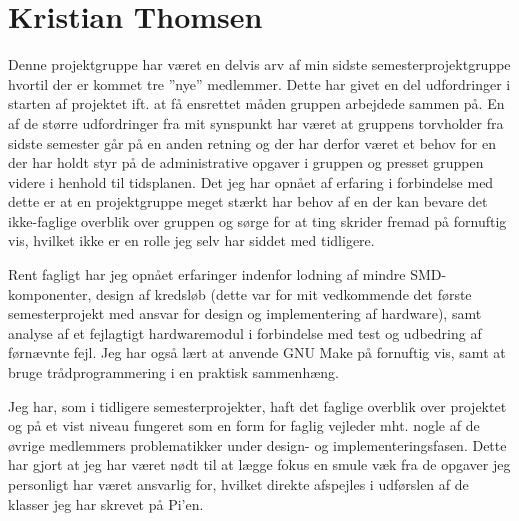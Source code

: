 \section{Kristian Thomsen}

Denne projektgruppe har været en delvis arv af min sidste semesterprojektgruppe hvortil der er kommet tre ''nye'' medlemmer.
Dette har givet en del udfordringer i starten af projektet ift. at få ensrettet måden gruppen arbejdede sammen på.
En af de større udfordringer fra mit synspunkt har været at gruppens torvholder fra sidste semester går på en anden retning og der har derfor været et behov for en der har holdt styr på de administrative opgaver i gruppen og presset gruppen videre i henhold til tidsplanen. 
Det jeg har opnået af erfaring i forbindelse med dette er at en projektgruppe meget stærkt har behov af en der kan bevare det ikke-faglige overblik over gruppen og sørge for at ting skrider fremad på fornuftig vis, hvilket ikke er en rolle jeg selv har siddet med tidligere.

Rent fagligt har jeg opnået erfaringer indenfor lodning af mindre SMD-komponenter, design af kredsløb (dette var for mit vedkommende det første semesterprojekt med ansvar for design og implementering af hardware), samt analyse af et fejlagtigt hardwaremodul i forbindelse med test og udbedring af førnævnte fejl.
Jeg har også lært at anvende GNU Make på fornuftig vis, samt at bruge trådprogrammering i en praktisk sammenhæng.

Jeg har, som i tidligere semesterprojekter, haft det faglige overblik over projektet og på et vist niveau fungeret som en form for faglig vejleder mht. nogle af de øvrige medlemmers problematikker under design- og implementeringsfasen. 
Dette har gjort at jeg har været nødt til at lægge fokus en smule væk fra de opgaver jeg personligt har været ansvarlig for, hvilket direkte afspejles i udførslen af de klasser jeg har skrevet på Pi'en.